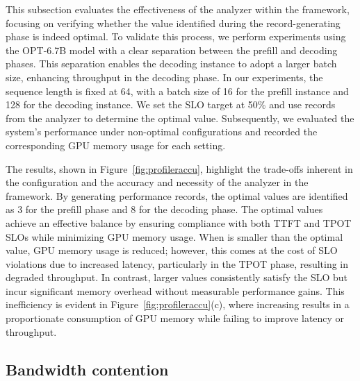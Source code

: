 This subsection evaluates the effectiveness of the \interval analyzer within the \sys framework, 
focusing on verifying whether the \interval value identified during the record-generating phase is indeed optimal. 
To validate this process, we perform experiments using the OPT-6.7B model with a clear separation between the prefill and decoding phases. 
This separation enables the decoding instance to adopt a larger batch size, enhancing throughput in the decoding phase. 
In our experiments, the sequence length is fixed at 64, with a batch size of 16 for the prefill instance and 128 for the decoding instance. 
We set the SLO target at 50\% and use records from the analyzer to determine the optimal \interval value. 
Subsequently, we evaluated the system's performance under non-optimal \interval configurations and recorded the corresponding GPU memory usage for each setting.

The results, shown in Figure~\ref{fig:profileraccu}, highlight the trade-offs inherent in the \interval configuration and the accuracy and necessity of the analyzer in the \sys framework. 
By generating performance records, the optimal \interval values are identified as 3 for the prefill phase and 8 for the decoding phase. 
The optimal \interval values achieve an effective balance by ensuring compliance with both TTFT and TPOT SLOs while minimizing GPU memory usage. 
When \interval is smaller than the optimal value, GPU memory usage is reduced; however, this comes at the cost of SLO violations due to increased latency, 
particularly in the TPOT phase, resulting in degraded throughput. 
In contrast, larger \interval values consistently satisfy the SLO but incur significant memory overhead without measurable performance gains. 
This inefficiency is evident in Figure~\ref{fig:profileraccu}(c), where increasing \interval results in a proportionate consumption of GPU memory while failing to improve latency or throughput.

\begin{figure*}[t]
    \centering
    \resizebox{0.8\textwidth}{!}{
 }
    \caption{The TTFT, TPOT, and memory usage of \sys under different \interval configurations. 
 The red dashed lines represent the SLO. The optimal \interval is 3 in (a) and 8 in (b).}
    \label{fig:profileraccu}
\end{figure*}


\subsection{Bandwidth contention}

